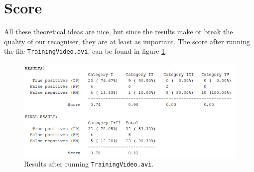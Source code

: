 \documentclass{tudelftposter}
\begin{document}
\section{Score}
All these theoretical ideas are nice, but since the results make or break the quality of our recogniser, they are at least as important. The score after running the file \texttt{TrainingVideo.avi}, can be found in figure \ref{score}. 

\begin{figure}[h]
	\centering
	\includegraphics[width=800pt]{score.png}
	\caption{Results after running \texttt{TrainingVideo.avi}.}
	\label{score}
\end{figure}
\end{document}

